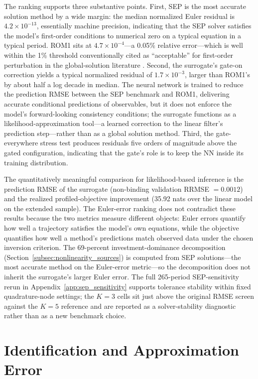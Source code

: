 \documentclass[12pt]{article}
\theoremstyle{plain}
\theoremstyle{definition}
\theoremstyle{remark}
\begin{document}
The ranking supports three substantive points. First, SEP is the most accurate solution method by a wide margin: the median normalized Euler residual is $4.2 \times 10^{-13}$, essentially machine precision, indicating that the SEP solver satisfies the model's first-order conditions to numerical zero on a typical equation in a typical period. ROM1 sits at $4.7 \times 10^{-4}$---a 0.05\% relative error---which is well within the 1\% threshold conventionally cited as ``acceptable'' for first-order perturbation in the global-solution literature \citep{aruoba2006comparing}. Second, the surrogate's gate-on correction yields a typical normalized residual of $1.7 \times 10^{-3}$, larger than ROM1's by about half a log decade in median. The neural network is trained to reduce the prediction RMSE between the SEP benchmark and ROM1, delivering accurate conditional predictions of observables, but it does not enforce the model's forward-looking consistency conditions; the surrogate functions as a likelihood-approximation tool---a learned correction to the linear filter's prediction step---rather than as a global solution method. Third, the gate-everywhere stress test produces residuals five orders of magnitude above the gated configuration, indicating that the gate's role is to keep the NN inside its training distribution.

The quantitatively meaningful comparison for likelihood-based inference is the prediction RMSE of the surrogate (non-binding validation RRMSE $= 0.0012$) and the realized profiled-objective improvement (35.92 nats over the linear model on the extended sample). The Euler-error ranking does not contradict these results because the two metrics measure different objects: Euler errors quantify how well a trajectory satisfies the model's own equations, while the objective quantifies how well a method's predictions match observed data under the chosen inversion criterion. The 69-percent investment-dominance decomposition (Section~\ref{subsec:nonlinearity_sources}) is computed from SEP solutions---the most accurate method on the Euler-error metric---so the decomposition does not inherit the surrogate's larger Euler error. The full 265-period SEP-sensitivity rerun in Appendix~\ref{app:sep_sensitivity} supports tolerance stability within fixed quadrature-node settings; the $K=3$ cells sit just above the original RMSE screen against the $K=5$ reference and are reported as a solver-stability diagnostic rather than as a new benchmark choice.


\section{Identification and Approximation Error}
\label{sec:identification}
\end{document}
